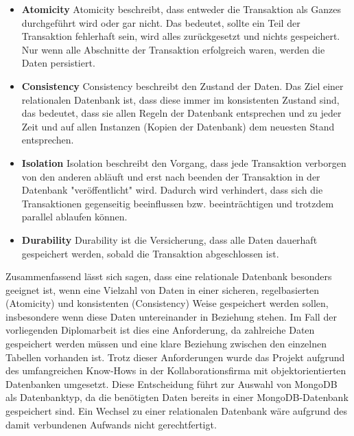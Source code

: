 \begin{itemize}
    \item \textbf{Atomicity}
        \newline
        Atomicity beschreibt, dass entweder die Transaktion als Ganzes durchgeführt wird oder gar nicht. Das bedeutet, sollte ein Teil der Transaktion fehlerhaft sein, wird alles zurückgesetzt und nichts gespeichert. Nur wenn alle Abschnitte der Transaktion erfolgreich waren, werden die Daten persistiert.
    \item \textbf{Consistency}
        \newline
       Consistency beschreibt den Zustand der Daten. Das Ziel einer relationalen Datenbank ist, dass diese immer im konsistenten Zustand sind, das bedeutet, dass sie allen Regeln der Datenbank entsprechen und zu jeder Zeit und auf allen Instanzen (Kopien der Datenbank) dem neuesten Stand entsprechen.
    \item \textbf{Isolation}
        \newline
        Isolation beschreibt den Vorgang, dass jede Transaktion verborgen von den anderen abläuft und erst nach beenden der Transaktion in der Datenbank "veröffentlicht" wird. Dadurch wird verhindert, dass sich die Transaktionen gegenseitig beeinflussen bzw. beeinträchtigen und trotzdem parallel ablaufen können.
    \item \textbf{Durability}
        \newline
        Durability ist die Versicherung, dass alle Daten dauerhaft gespeichert werden, sobald die Transaktion abgeschlossen ist.
\end{itemize}
Zusammenfassend lässt sich sagen, dass eine relationale Datenbank besonders geeignet ist, wenn eine Vielzahl von Daten in einer sicheren, regelbasierten (Atomicity) und konsistenten (Consistency) Weise gespeichert werden sollen, insbesondere wenn diese Daten untereinander in Beziehung stehen. Im Fall der vorliegenden Diplomarbeit ist dies eine Anforderung, da zahlreiche Daten gespeichert werden müssen und eine klare Beziehung zwischen den einzelnen Tabellen vorhanden ist.
\newline
Trotz dieser Anforderungen wurde das Projekt aufgrund des umfangreichen Know-Hows in der Kollaborationsfirma mit objektorientierten Datenbanken umgesetzt. Diese Entscheidung führt zur Auswahl von MongoDB als Datenbanktyp, da die benötigten Daten bereits in einer MongoDB-Datenbank gespeichert sind. Ein Wechsel zu einer relationalen Datenbank wäre aufgrund des damit verbundenen Aufwands nicht gerechtfertigt.
